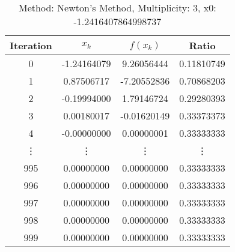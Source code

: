 \begin{table}
\centering
\caption{Method: Newton's Method, Multiplicity: 3, x0: -1.2416407864998737}
\label{tab:table_Newton's_Method_3_-1_2416407864998737}
\begin{tabular}{c c c c}
\toprule
Iteration &       $x_k$ &    $f(x_k)$ &      Ratio \\
\midrule
        0 & -1.24164079 &  9.26056444 & 0.11810749 \\
        1 &  0.87506717 & -7.20552836 & 0.70868203 \\
        2 & -0.19994000 &  1.79146724 & 0.29280393 \\
        3 &  0.00180017 & -0.01620149 & 0.33373373 \\
        4 & -0.00000000 &  0.00000001 & 0.33333333 \\
   \vdots &      \vdots &      \vdots &     \vdots \\
      995 &  0.00000000 &  0.00000000 & 0.33333333 \\
      996 &  0.00000000 &  0.00000000 & 0.33333333 \\
      997 &  0.00000000 &  0.00000000 & 0.33333333 \\
      998 &  0.00000000 &  0.00000000 & 0.33333333 \\
      999 &  0.00000000 &  0.00000000 & 0.33333333 \\
\bottomrule
\end{tabular}
\end{table}
